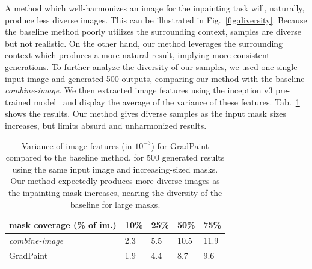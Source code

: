 A method which well-harmonizes an image for the inpainting task will, naturally, produce less diverse images. This can be illustrated in Fig.~\ref{fig:diversity}. Because the baseline method poorly utilizes the surrounding context, samples are diverse but not realistic. On the other hand, our method leverages the surrounding context which produces a more natural result, implying more consistent generations. 
To further analyze the diversity of our samples, we used one single input image and generated 500 outputs, comparing our method with the baseline \emph{combine-image}. We then extracted image features using the inception v3 pre-trained model~\citep{inceptionv3} and display the average of the variance of these features. Tab.~\ref{tab:diversitytab} shows the results. Our method gives diverse samples as the input mask sizes increases, but limits absurd and unharmonized results.



\begin{table}[]
\centering
\begin{tabular}{|l|l|l|l|l|}
\hline
\multicolumn{1}{|c|}{ mask coverage (\% of im.)} & \multicolumn{1}{c|}{10\%} & \multicolumn{1}{c|}{25\%} & \multicolumn{1}{c|}{50\%} & \multicolumn{1}{c|}{75\%} \\ \hline
\textit{combine-image}                            & 2.3                       & 5.5                       & 10.5                      & 11.9                      \\ \hline
GradPaint                                         & 1.9                       & 4.4                       & 8.7                       & 9.6                       \\ \hline
\end{tabular}
\caption{Variance of image features (in $10^{-3}$) for GradPaint compared to the baseline method, for 500 generated results using the same input image and increasing-sized masks.  Our method expectedly produces more diverse images as the inpainting mask increases, nearing the diversity of the baseline for large masks.}
\label{tab:diversitytab}
\vspace{-.45cm}
\end{table}





